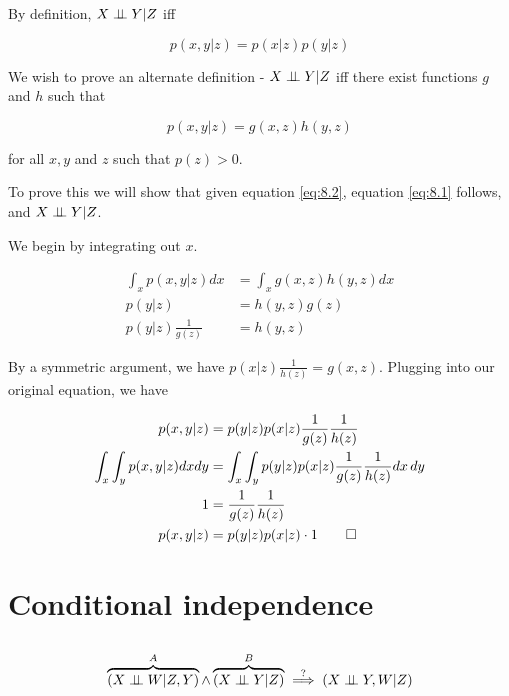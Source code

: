 \documentclass{article}
\begin{document}
\setcounter{equation}{0}

By definition, $X \perp\!\!\!\perp Y | Z$ iff

\begin{equation} \label{eq:8.1}
  p(x,y|z) = p(x|z)p(y|z)
\end{equation}

We wish to prove an alternate definition - $X \perp\!\!\!\perp Y | Z$ iff there
exist functions $g$ and $h$ such that

\begin{equation} \label{eq:8.2}
  p(x,y|z) = g(x,z)h(y,z)
\end{equation}

for all $x, y$ and $z$ such that $p(z) > 0$.

To prove this we will show that given equation \ref{eq:8.2}, equation
\ref{eq:8.1} follows, and $X \perp\!\!\!\perp Y | Z$.

We begin by integrating out $x$.

\begin{align*}
  \int_x p(x,y|z) dx &= \int_x g(x,z)h(y,z)dx \\
  p(y|z) &= h(y,z)g(z) \\
  p(y|z) \frac{1}{g(z)} &= h(y,z)
\end{align*}

By a symmetric argument, we have $p(x|z) \frac{1}{h(z)} = g(x,z)$.
Plugging into our original equation, we have

\begin{align*}
  p(x,y|z) &= p(y|z)p(x|z)\frac{1}{g(z)}\frac{1}{h(z)} \\
  \int_x \int_y p(x,y|z) dx dy &= \int_x \int_y
                                 p(y|z)p(x|z)\frac{1}{g(z)}\frac{1}{h(z)}
  dx\,dy \\
  1 &= \frac{1}{g(z)}\frac{1}{h(z)} \\
  p(x,y|z) &= p(y|z)p(x|z) \cdot 1 \qed
\end{align*}

\section{Conditional independence}

\subsection{}

\setcounter{equation}{0}

\[
\overbrace{(X \ci W | Z,Y)}^{A} \wedge \overbrace{(X \ci Y | Z)}^{B}
\stackrel{?}{\implies} (X \ci Y,W | Z)
\]
\end{document}
